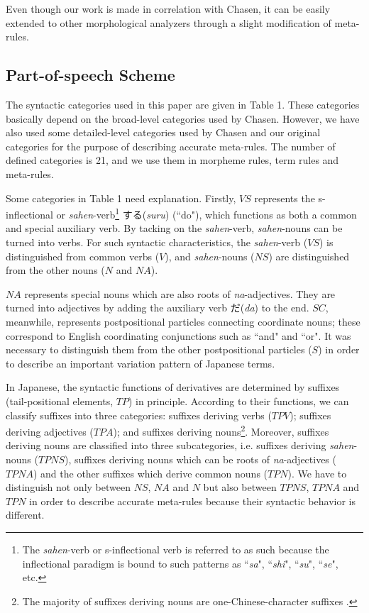 Even though our work is made in correlation with Chasen, it can be easily extended to other morphological analyzers through a slight modification of meta-rules.

\subsection{Part-of-speech Scheme}

The syntactic categories used in this paper are given in Table 1. These categories basically depend on the broad-level categories used by Chasen. However, we have also used some detailed-level categories used by Chasen and our original categories for the purpose of describing accurate meta-rules. The number of defined categories is 21, and we use them in morpheme rules, term rules and meta-rules.

Some categories in Table 1 need explanation. Firstly, $VS$ represents the s-inflectional or {\it sahen}-verb\footnote{The {\it sahen}-verb or s-inflectional verb is referred to as such because the inflectional paradigm is bound to such patterns as ``{\it sa}", ``{\it shi}", ``{\it su}", ``{\it se}", etc.} する({\it suru}) (``do"), which functions as both a common and special auxiliary verb. By tacking on the {\it sahen}-verb, {\it sahen}-nouns can be turned into verbs. For such syntactic characteristics, the {\it sahen}-verb ($VS$) is distinguished from common verbs ($V$), and {\it sahen}-nouns ($NS$) are distinguished from the other nouns ($N$ and $NA$). 

$NA$ represents special nouns which are also roots of {\it na}-adjectives. They are turned into adjectives by adding the auxiliary verb だ({\it da}) to the end. $SC$, meanwhile, represents postpositional particles connecting coordinate nouns; these correspond to English coordinating conjunctions such as ``and" and ``or". It was necessary to distinguish them from the other postpositional particles ($S$) in order to describe an important variation pattern of Japanese terms.

In Japanese, the syntactic functions of derivatives are determined by suffixes (tail-positional elements, $TP$) in principle. According to their functions, we can classify suffixes into three categories: suffixes deriving verbs ($TPV$); suffixes deriving adjectives ($TPA$); and suffixes deriving nouns\footnote{The majority of suffixes deriving nouns are one-Chinese-character suffixes \cite{Nomura,Kageura}.}. Moreover, suffixes deriving nouns are classified into three subcategories, i.e. suffixes deriving {\it sahen}-nouns ($TPNS$), suffixes deriving nouns which can be roots of {\it na}-adjectives ($TPNA$) and the other suffixes which derive common nouns ($TPN$). We have to distinguish not only between $NS$, $NA$ and $N$ but also between $TPNS$, $TPNA$ and $TPN$ in order to describe accurate meta-rules because their syntactic behavior is different.

